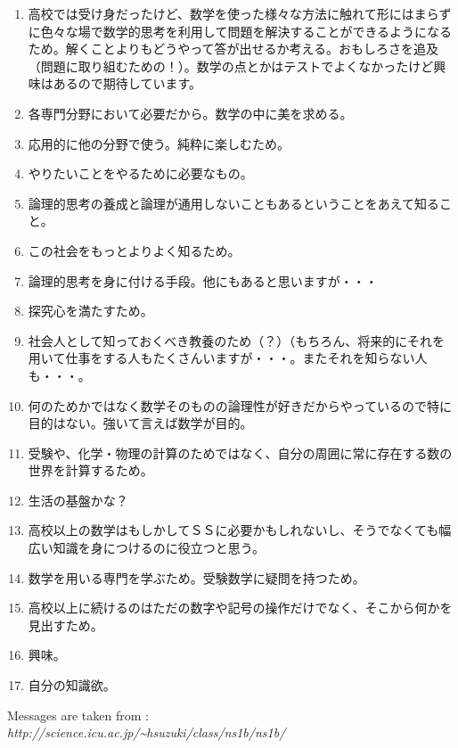 \documentclass[twocolumn]{jarticle}
\begin{document}
\begin{enumerate}
\item 高校では受け身だったけど、数学を使った様々な方法に触れて形にはまらずに色々な場で数学的思考を利用して問題を解決することができるようになるため。解くことよりもどうやって答が出せるか考える。おもしろさを追及（問題に取り組むための！）。数学の点とかはテストでよくなかったけど興味はあるので期待しています。
\item 各専門分野において必要だから。数学の中に美を求める。
\item 応用的に他の分野で使う。純粋に楽しむため。
\item やりたいことをやるために必要なもの。
\item 論理的思考の養成と論理が通用しないこともあるということをあえて知ること。
\item この社会をもっとよりよく知るため。
\item 論理的思考を身に付ける手段。他にもあると思いますが・・・
\item 探究心を満たすため。
\item 社会人として知っておくべき教養のため（？）（もちろん、将来的にそれを用いて仕事をする人もたくさんいますが・・・。またそれを知らない人も・・・。
\item 何のためかではなく数学そのものの論理性が好きだからやっているので特に目的はない。強いて言えば数学が目的。
\item 受験や、化学・物理の計算のためではなく、自分の周囲に常に存在する数の世界を計算するため。
\item 生活の基盤かな？
\item 高校以上の数学はもしかしてＳＳに必要かもしれないし、そうでなくても幅広い知識を身につけるのに役立つと思う。
\item 数学を用いる専門を学ぶため。受験数学に疑問を持つため。
\item 高校以上に続けるのはただの数字や記号の操作だけでなく、そこから何かを見出すため。
\item 興味。
\item 自分の知識欲。
\end{enumerate}

{\footnotesize Messages are taken from : \\
\hfill {\it http://science.icu.ac.jp/\textasciitilde hsuzuki/class/ns1b/ns1b/}}
\end{document}

